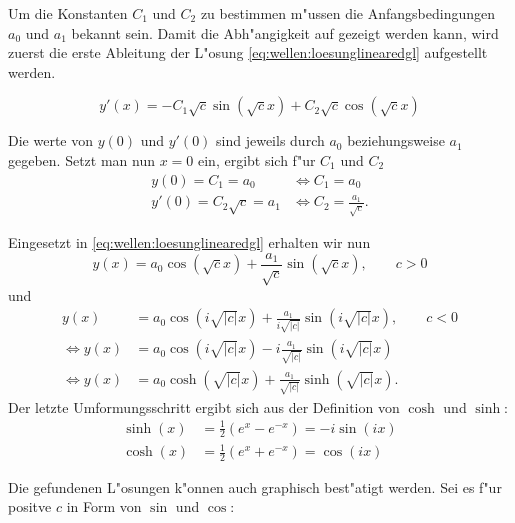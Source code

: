 Um die Konstanten $C_1$ und $C_2$ zu bestimmen m"ussen die Anfangsbedingungen 
$a_0$ und $a_1$ bekannt sein. Damit die Abh"angigkeit auf gezeigt werden kann, 
wird zuerst die erste Ableitung der L"osung \ref{eq:wellen:loesunglinearedgl} 
aufgestellt werden.

\begin{equation}
	y'(x)=-C_1 \sqrt{c} \sin(\sqrt{c}x) + C_2 \sqrt{c} \cos(\sqrt{c}x)
\end{equation}

Die werte von $y(0)$ und $y'(0)$ sind jeweils durch $a_0$ beziehungsweise $a_1$ 
gegeben. Setzt man nun $x = 0$ ein, ergibt sich f"ur $C_1$ und $C_2$
\begin{equation}
	\begin{split}
		y(0) = C_1 = a_0 &\Leftrightarrow C_1 = a_0 \\
		y'(0) = C_2 \sqrt{c} = a_1 &\Leftrightarrow C_2 = \frac{a_1}{\sqrt{c}}.
	\end{split}
\end{equation}

Eingesetzt in \ref{eq:wellen:loesunglinearedgl} erhalten wir nun
\begin{equation*}
	y(x) = a_0 \cos(\sqrt{c}x) + \frac{a_1}{\sqrt{c}} \sin(\sqrt{c}x), \qquad c 
	> 0
\end{equation*}
und
\begin{equation}
\begin{split}
	y(x) &= a_0 \cos(i\sqrt{|c|}x) + \frac{a_1}{i\sqrt{|c|}}\sin(i\sqrt{|c|}x), 
	\qquad c < 0\\
	\Leftrightarrow
	y(x) &= a_0 \cos(i\sqrt{|c|}x) - i\frac{a_1}{\sqrt{|c|}}\sin(i\sqrt{|c|}x)\\
	\Leftrightarrow
	y(x) &= a_0 \cosh(\sqrt{|c|}x) + \frac{a_1}{\sqrt{|c|}}\sinh(\sqrt{|c|}x).
\end{split}	
\end{equation}
Der letzte Umformungsschritt ergibt sich aus der Definition von $\cosh$ und 
$\sinh$:
\begin{equation*}
\begin{split}
	\sinh(x) &= \frac{1}{2} (e^x - e^{-x}) = -i \sin(ix)\\
	\cosh(x) &= \frac{1}{2} (e^x + e^{-x}) = \cos (ix)
\end{split}
\end{equation*}

Die gefundenen L"osungen k"onnen auch graphisch best"atigt werden. Sei es f"ur 
positve $c$ in Form von $\sin$ und $\cos$:

